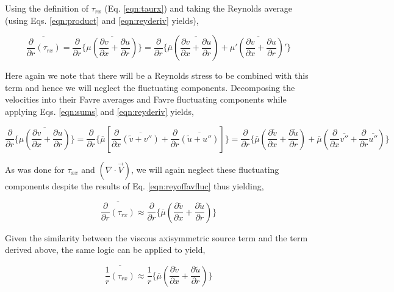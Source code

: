 	Using the definition of $\tau_{rx}$ (Eq. \ref{eqn:taurx}) and taking the Reynolds average (using Eqs. \ref{eqn:product}
and \ref{eqn:reyderiv} yields),

\begin{displaymath}
	\overline{\frac{\partial}{\partial r}(\tau_{rx})} = \frac{\partial}{\partial r}\Big\{
	\overline{\mu(\frac{\partial v}{\partial x} + \frac{\partial u}{\partial r})}\Big\} = \frac{\partial}{\partial r}\Big\{
	\overline{\mu}(\overline{\frac{\partial v}{\partial x} + \frac{\partial u}{\partial r}}) + 
	\overline{\mu'(\frac{\partial v}{\partial x} + \frac{\partial u}{\partial r})'}\Big\}
\end{displaymath}

	Here again we note that there will be a Reynolds stress to be combined with this term and hence 
we will neglect the fluctuating components.  Decomposing the
velocities into their Favre averages and Favre fluctuating components while applying Eqs. \ref{eqn:sums} and 
\ref{eqn:reyderiv} yields,

\begin{displaymath}
	\frac{\partial}{\partial r}\Big\{\overline{\mu(\frac{\partial v}{\partial x} + \frac{\partial u}{\partial r})}\Big\} 
	= \frac{\partial}{\partial r}\Big\{\overline{\mu}[\frac{\partial}{\partial x}\overline{(\tilde{v} + v'')} + 
	\frac{\partial}{\partial r}\overline{(\tilde{u} + u'')}]\Big\} =  \frac{\partial}{\partial r}\Big\{\overline{\mu}
	(\frac{\partial \tilde{v}}{\partial x} + \frac{\partial \tilde{u}}{\partial r}) + \overline{\mu}
	(\frac{\partial}{\partial x}\overline{v''} + \frac{\partial}{\partial r}\overline{u''})\Big\}
\end{displaymath}

	As was done for $\tau_{xx}$ and $(\nabla \cdot \vec{V})$, we will again neglect these fluctuating components 
despite the results of Eq. \ref{eqn:reyoffavfluc} thus yielding,

\begin{equation}
	\overline{\frac{\partial}{\partial r}(\tau_{rx})} \approx \frac{\partial}{\partial r}\Big\{\overline{\mu}
	(\frac{\partial \tilde{v}}{\partial x} + \frac{\partial \tilde{u}}{\partial r})\Big\}	
\label{eqn:taurxturb}
\end{equation}

	Given the similarity between the viscous axisymmetric source term and the term derived above, the
same logic can be applied to yield,

\begin{displaymath}
	\overline{\frac{1}{r}(\tau_{rx})} \approx \frac{1}{r}\Big\{\overline{\mu}
	(\frac{\partial \tilde{v}}{\partial x} + \frac{\partial \tilde{u}}{\partial r})\Big\}	
\end{displaymath}

